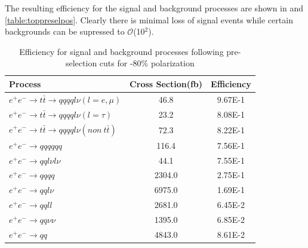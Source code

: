 The resulting efficiency for the signal and background processes are shown in  and \ref{table:toppreselpos}. Clearly there is minimal loss of signal events while certain backgrounds can be supressed to $\mathcal{O}$(10$^2$).

\begin{table}
  \centering
  \begin{tabular}{l | c | c }
    \toprule
    Process     & Cross Section(fb) & Efficiency  \\
     \midrule
     $e^+e^-\rightarrow t\bar{t} \rightarrow qqqql\nu (l=e,\mu)$& 46.8 & 9.67E-1 \\
    \midrule
    $e^+e^-\rightarrow t\bar{t} \rightarrow qqqql\nu (l=\tau)$& 23.2 & 8.08E-1 \\
    \midrule
    $e^+e^-\rightarrow t\bar{t} \rightarrow qqqql\nu (non ~ t\bar{t})$& 72.3 & 8.22E-1\\
    \midrule
    $e^+e^-\rightarrow qqqqqq$ & 116.4 &  7.56E-1\\
    \midrule
    $e^+e^-\rightarrow qql\nu l\nu$ & 44.1 &  7.55E-1\\
    \midrule
    $e^+e^-\rightarrow qqqq$ & 2304.0 &  2.75E-1\\
    \midrule
    $e^+e^-\rightarrow qql\nu$ & 6975.0 &  1.69E-1\\
    \midrule
    $e^+e^-\rightarrow qqll$ & 2681.0 &  6.45E-2\\
    \midrule
    $e^+e^-\rightarrow qq\nu\nu$ & 1395.0 &  6.85E-2\\
    \midrule
    $e^+e^-\rightarrow qq$ & 4843.0 & 8.61E-2\\
    \bottomrule
  \end{tabular}
  \caption{Efficiency for signal and background processes following pre-selection cuts for -80\% polarization}
  \label{table:toppreselneg}
\end{table}

